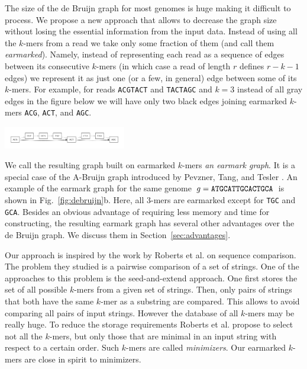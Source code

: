\documentclass[17pt]{extarticle}
\theoremstyle{definition}
\begin{document}
\begin{multicols}{2}
The size of the de Bruijn graph for most genomes is huge making
it difficult to process. 
We propose a new approach that allows to decrease
the graph size without losing the essential information from the input data.
Instead of using all the $k$-mers from a read we take only some fraction of them
(and call them \emph{earmarked}).
Namely, instead 
of representing each read as a sequence of edges 
between its consecutive $k$-mers (in which case a read of length $r$ defines
$r-k-1$ edges) we represent it as just one (or a few, in general)
edge between some of its $k$-mers. For example, for 
reads {\tt ACGTACT} and {\tt TACTAGC} and $k=3$
instead of all gray edges in the figure below we will have 
only two black edges joining earmarked $k$-mers {\tt ACG}, {\tt ACT}, and {\tt AGC}.
\begin{center}
\includegraphics[width=0.4\textwidth]{fig1.pdf}
\end{center}
We call the resulting graph built on earmarked $k$-mers \emph{an earmark graph}.
It is a special case of the A-Bruijn graph introduced by Pevzner, Tang, and Tesler \cite{PTG04}.
An example of the earmark graph for the same genome $g={\tt ATGCATTGCACTGCA}$ is shown in Fig.~\ref{fig:debruijn}b.
Here, all $3$-mers are earmarked except for {\tt TGC} and {\tt GCA}.
Besides an obvious advantage of requiring less memory 
and time for constructing, the resulting earmark graph has several other advantages over the
de Bruijn graph. We discuss them 
in Section~\ref{sec:advantages}.

Our approach is inspired by the work by Roberts et al. \cite{RW04} on sequence comparison.
The problem they studied is a pairwise comparison of a set of strings. 
One of the approaches to this problem is the seed-and-extend approach.
One first stores the set of all possible $k$-mers from a given set of strings.
Then, only pairs of strings that both have the same $k$-mer as a substring are compared.
This allows to avoid comparing all pairs of input strings. However the database
of all $k$-mers may be really huge. To reduce the storage requirements Roberts et al. propose
to select not all the $k$-mers, but only those that are minimal in an input string with respect
to a certain order. Such $k$-mers are called \emph{minimizers}. Our earmarked $k$-mers are close in spirit 
to minimizers.


\end{multicols}
\end{document}
